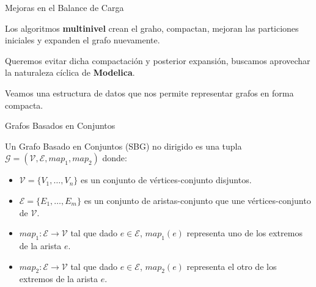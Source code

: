 \begin{frame}{Mejoras en el Balance de Carga}

    Los algoritmos \textbf{multinivel} crean el graho, compactan, mejoran las
    particiones iniciales y expanden el grafo nuevamente.

    Queremos evitar dicha compactación y posterior expansión,
    buscamos aprovechar la naturaleza cíclica de \textbf{Modelica}.

    Veamos una estructura de datos que nos permite representar grafos en forma compacta.

\end{frame}


\begin{frame}{Grafos Basados en Conjuntos}

Un Grafo Basado en Conjuntos (SBG) no dirigido es una tupla
$\mathcal{G} = (\mathcal{V}, \mathcal{E}, map_1, map_2)$ donde:

\begin{itemize}
    \item $\mathcal{V} = \{V_1, \ldots, V_n \}$ es un conjunto de 
    vértices-conjunto disjuntos.

    \item $\mathcal{E} = \{E_1, \ldots, E_m \}$ es un conjunto de 
    aristas-conjunto que une vértices-conjunto de $\mathcal{V}$.

    \item $map_1 : \mathcal{E} \to \mathcal{V}$ tal que dado
    $e \in \mathcal{E}$, $map_1(e)$ representa uno de los extremos
    de la arista $e$.

    \item $map_2 : \mathcal{E} \to \mathcal{V}$ tal que dado
    $e \in \mathcal{E}$, $map_2(e)$ representa el otro de los
    extremos de la arista $e$.
\end{itemize}

\end{frame}

